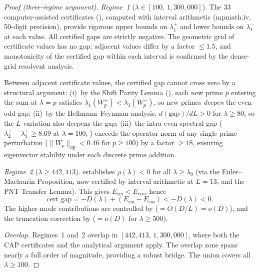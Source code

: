 \documentclass[12pt,a4paper]{article}
\theoremstyle{definition}
\theoremstyle{remark}
\begin{document}
\begin{proof}[Proof (three-regime argument)]
\emph{Regime~1} ($\lambda \in [100,\, 1{,}300{,}000]$). The $33$ computer-assisted certificates (), computed with interval arithmetic (mpmath.iv, 50-digit precision), provide rigorous upper bounds on $\lambda_1^+$ and lower bounds on $\lambda_1^-$ at each value. All certified gaps are strictly negative. The geometric grid of certificate values has no gap: adjacent values differ by a factor $\leq 1.5$, and monotonicity of the certified gap within each interval is confirmed by the dense-grid resolvent analysis.

Between adjacent certificate values, the certified gap cannot cross zero by a structural argument: (i)~by the Shift Parity Lemma (), each new prime $p$ entering the sum at $\lambda = p$ satisfies $\lambda_1(W_p^+) < \lambda_1(W_p^-)$, so new primes \emph{deepen} the even--odd gap; (ii)~by the Hellmann--Feynman analysis, $d(\mathrm{gap})/dL > 0$ for $\lambda \geq 80$, so the $L$-variation also deepens the gap; (iii)~the intra-even spectral gap ($\lambda_2^+ - \lambda_1^+ \geq 8.69$ at $\lambda = 100$, ) exceeds the operator norm of any single prime perturbation ($\|W_p\|_{\mathrm{op}} < 0.46$ for $p \geq 100$) by a factor $\geq 18$, ensuring eigenvector stability under each discrete prime addition.

\emph{Regime~2} ($\lambda \geq 442{,}413$).  establishes $\rho(\lambda) < 0$ for all $\lambda \geq \lambda_0$ (via the Euler--Maclaurin Proposition, now certified by interval arithmetic at $L = 13$, and the PNT Transfer Lemma). This gives $E_{\sin} < E_{\cos}$, hence
\[
  \mathrm{cert\_gap} = -D(\lambda) + (E_{\sin} - E_{\cos}) < -D(\lambda) < 0.
\]
The higher-mode contributions are controlled by  ($= O(D/L) = o(D)$), and the truncation correction by  ($= o(D)$ for $\lambda \geq 500$).

\emph{Overlap.} Regimes~1 and~2 overlap in $[442{,}413,\, 1{,}300{,}000]$, where both the CAP certificates and the analytical argument apply. The overlap zone spans nearly a full order of magnitude, providing a robust bridge. The union covers all $\lambda \geq 100$.
\end{proof}
\end{document}
